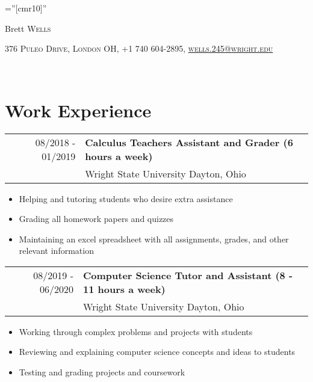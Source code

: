 \documentclass[12pt,a4paper,roman]{moderncv}        %
\begin{document}

\pagestyle{empty} %

\font\fb=''[cmr10]'' %

\par{\centering
		{\Huge Brett \textsc{Wells}
	}\bigskip\par}
	
	\par{\centering
		{\textsc{376 Puleo Drive, London OH, +1 740 604-2895, \href{mailto:wells.245@wright.edu}{wells.245@wright.edu}}
	}\bigskip\par}
\

\section{Work Experience}
\begin{tabular}{rl}	
\textsc{08/2018 - 01/2019} & \textbf{Calculus Teachers Assistant and Grader (6 hours a week)} \\
\textit{} & Wright State University Dayton, Ohio\\
\end{tabular}
\begin{itemize}
  \item Helping and tutoring students who desire extra assistance
  \item Grading all homework papers and quizzes 
  \item Maintaining an excel spreadsheet with all assignments, grades, and other relevant information
\end{itemize}

\begin{tabular}{rl}	
\textsc{08/2019 - 06/2020} & \textbf{Computer Science Tutor and Assistant (8 - 11 hours a week)} \\
\textit{} & Wright State University Dayton, Ohio\\
\end{tabular}
\begin{itemize}
  \item Working through complex problems and projects with students
  \item Reviewing and explaining computer science concepts and ideas to students
  \item Testing and grading projects and coursework
\end{itemize}
\end{document}
